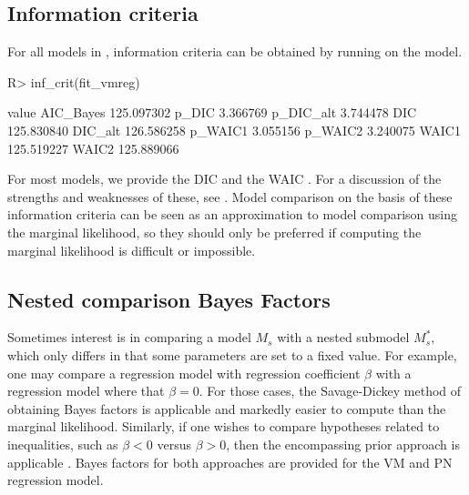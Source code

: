 \hypertarget{information-criteria}{%
\subsection{Information criteria}\label{information-criteria}}

\label{infcrit}

For all models in , information criteria can be obtained
by running  on the model.

\begin{CodeChunk}

\begin{CodeInput}
R> inf_crit(fit_vmreg)
\end{CodeInput}

\begin{CodeOutput}
               value
AIC_Bayes 125.097302
p_DIC       3.366769
p_DIC_alt   3.744478
DIC       125.830840
DIC_alt   126.586258
p_WAIC1     3.055156
p_WAIC2     3.240075
WAIC1     125.519227
WAIC2     125.889066
\end{CodeOutput}
\end{CodeChunk}

For most models, we provide the DIC \citep{spiegelhalter2002bayesian}
and the WAIC \citep{watanabe2010asymptotic}. For a discussion of the
strengths and weaknesses of these, see
\citet[Ch. 7]{gelman2003bayesian}. Model comparison on the basis of
these information criteria can be seen as an approximation to model
comparison using the marginal likelihood, so they should only be
preferred if computing the marginal likelihood is difficult or
impossible.

\hypertarget{nested-comparison-bayes-factors}{%
\subsection{Nested comparison Bayes
Factors}\label{nested-comparison-bayes-factors}}

\label{sec:nested}

Sometimes interest is in comparing a model \(M_s\) with a nested
submodel \(M^\ast_s,\) which only differs in that some parameters are
set to a fixed value. For example, one may compare a regression model
with regression coefficient \(\beta\) with a regression model where that
\(\beta = 0.\) For those cases, the Savage-Dickey method of obtaining
Bayes factors is applicable
\citep{dickey1970weighted, o2004kendall, wagenmakers2010sdd} and
markedly easier to compute than the marginal likelihood. Similarly, if
one wishes to compare hypotheses related to inequalities, such as
\(\beta < 0\) versus \(\beta > 0\), then the encompassing prior approach
is applicable \citet{klugkist2005inequality, wetzels2010encompassing}.
Bayes factors for both approaches are provided for the VM and PN
regression model.

